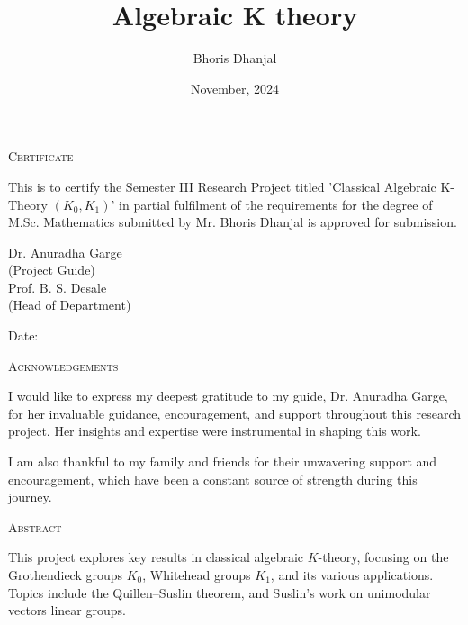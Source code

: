\documentclass[12pt]{report}
\title{Algebraic K theory}
\author{Bhoris Dhanjal}
\date{November, 2024}
\makeatletter
\numberwithin{equation}{section}
\newcommand\frontmatter{%
	\cleardoublepage
	\@mainmatterfalse
	\pagenumbering{roman}}
\newcommand\mainmatter{%
	\cleardoublepage
	 \@mainmattertrue
	\pagenumbering{arabic}}
\makeatother
\begin{document}
	

	\frontmatter
	
	\begin{center}
		

		{\LARGE {\textsc{Certificate}}}\\[2.5cm]
	\end{center}
	\normalsize This is to certify the Semester III Research Project titled 'Classical Algebraic K-Theory $(K_0,K_1)$' in partial fulfilment of the requirements for the degree of M.Sc. Mathematics  submitted by Mr. Bhoris Dhanjal is approved for submission.
	

	
	\vfill
	
	
	\begin{flushright}
		Dr. Anuradha Garge\\
		(Project Guide)\\[1.5cm]
		Prof. B. S. Desale\\
		(Head of Department)\\
	\end{flushright}
	
	\begin{flushleft}
		Date:
	\end{flushleft}
	\clearpage
	
	\begin{center}
	
	
	{\LARGE {\textsc{Acknowledgements}}}\\[1cm]
\end{center}
I would like to express my deepest gratitude to my guide, Dr. Anuradha Garge, for her invaluable guidance, encouragement, and support throughout this research project. Her insights and expertise were instrumental in shaping this work.

I am also thankful to my family and friends for their unwavering support and encouragement, which have been a constant source of strength during this journey.
	\clearpage
	\begin{center}
		
		
		{\LARGE {\textsc{Abstract}}}\\[1cm]
	\end{center}
This project explores key results in classical algebraic \( K \)-theory, focusing on the Grothendieck groups \( K_0 \), Whitehead groups \( K_1 \), and its various applications. Topics include the Quillen–Suslin theorem, and Suslin's work on unimodular vectors linear groups.
\clearpage
	\tableofcontents
	\mainmatter
	
\end{document}
